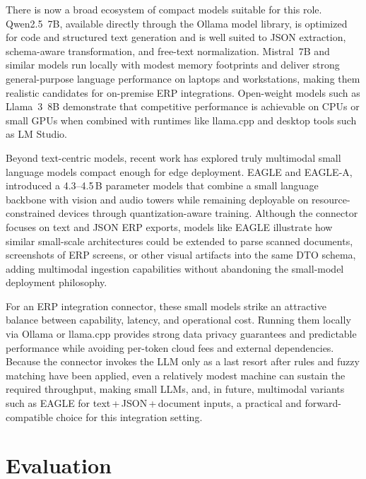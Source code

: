 \documentclass{article}
\begin{document}
There is now a broad ecosystem of compact models suitable for this role.
Qwen2.5~7B, available directly through the Ollama model library, is optimized for code and
structured text generation and is well suited to JSON extraction, schema-aware transformation,
and free-text normalization.\autocite{ollama2025qwen}
Mistral~7B and similar models run locally with modest memory footprints and deliver strong
general-purpose language performance on laptops and workstations, making them realistic
candidates for on-premise ERP integrations.\autocite{getdeploying2025mistral,amax2023mistral}
Open-weight models such as Llama~3~8B demonstrate that competitive performance is achievable
on CPUs or small GPUs when combined with runtimes like llama.cpp and desktop tools such as LM
Studio.\autocite{reintech2026llama,premai2026selfhosted}

Beyond text-centric models, recent work has explored truly multimodal small language models
compact enough for edge deployment.
EAGLE and EAGLE-A, introduced a 4.3--4.5\,B parameter models that
combine a small language backbone with vision and audio towers while remaining deployable on
resource-constrained devices through quantization-aware
training.\autocite{koskahorvath2024eagle}
Although the connector focuses on text and JSON ERP exports, models like EAGLE illustrate how
similar small-scale architectures could be extended to parse scanned documents, screenshots of
ERP screens, or other visual artifacts into the same DTO schema, adding multimodal ingestion
capabilities without abandoning the small-model deployment philosophy.

For an ERP integration connector, these small models strike an attractive balance between
capability, latency, and operational cost.
Running them locally via Ollama or llama.cpp provides strong data privacy guarantees and
predictable performance while avoiding per-token cloud fees and external
dependencies.\autocite{daily2026ollama,premai2026selfhosted}
Because the connector invokes the LLM only as a last resort after rules and fuzzy matching
have been applied, even a relatively modest machine can sustain the required throughput, making
small LLMs, and, in future, multimodal variants such as EAGLE for
text\,+\,JSON\,+\,document inputs, a practical and forward-compatible choice for this
integration setting.\autocite{koskahorvath2024eagle}

\section{Evaluation}
\end{document}
